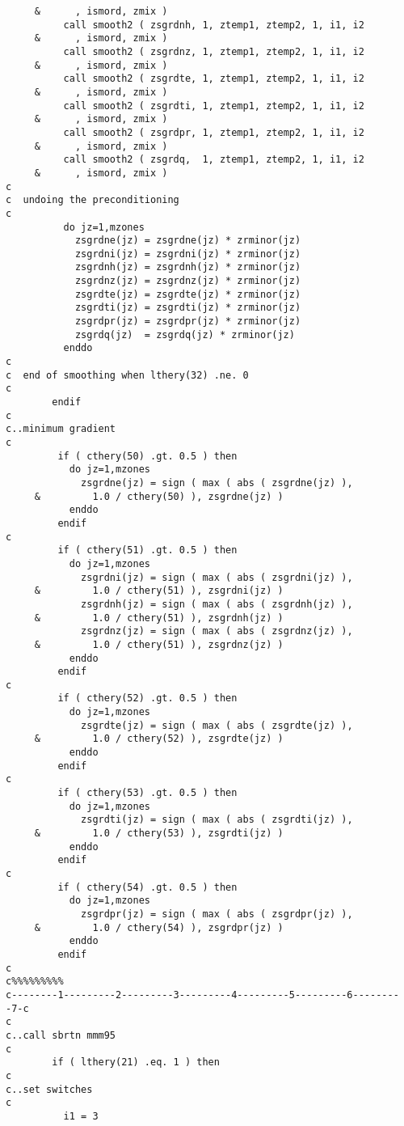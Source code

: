 \begin{verbatim}
     &      , ismord, zmix )
          call smooth2 ( zsgrdnh, 1, ztemp1, ztemp2, 1, i1, i2
     &      , ismord, zmix )
          call smooth2 ( zsgrdnz, 1, ztemp1, ztemp2, 1, i1, i2
     &      , ismord, zmix )
          call smooth2 ( zsgrdte, 1, ztemp1, ztemp2, 1, i1, i2
     &      , ismord, zmix )
          call smooth2 ( zsgrdti, 1, ztemp1, ztemp2, 1, i1, i2
     &      , ismord, zmix )
          call smooth2 ( zsgrdpr, 1, ztemp1, ztemp2, 1, i1, i2
     &      , ismord, zmix )
          call smooth2 ( zsgrdq,  1, ztemp1, ztemp2, 1, i1, i2
     &      , ismord, zmix )
c
c  undoing the preconditioning
c
          do jz=1,mzones
            zsgrdne(jz) = zsgrdne(jz) * zrminor(jz)
            zsgrdni(jz) = zsgrdni(jz) * zrminor(jz)
            zsgrdnh(jz) = zsgrdnh(jz) * zrminor(jz)
            zsgrdnz(jz) = zsgrdnz(jz) * zrminor(jz)
            zsgrdte(jz) = zsgrdte(jz) * zrminor(jz)
            zsgrdti(jz) = zsgrdti(jz) * zrminor(jz)
            zsgrdpr(jz) = zsgrdpr(jz) * zrminor(jz)
            zsgrdq(jz)  = zsgrdq(jz) * zrminor(jz)
          enddo
c
c  end of smoothing when lthery(32) .ne. 0
c
        endif
c
c..minimum gradient
c
         if ( cthery(50) .gt. 0.5 ) then
           do jz=1,mzones
             zsgrdne(jz) = sign ( max ( abs ( zsgrdne(jz) ),
     &         1.0 / cthery(50) ), zsgrdne(jz) )
           enddo
         endif
c
         if ( cthery(51) .gt. 0.5 ) then
           do jz=1,mzones
             zsgrdni(jz) = sign ( max ( abs ( zsgrdni(jz) ),
     &         1.0 / cthery(51) ), zsgrdni(jz) )
             zsgrdnh(jz) = sign ( max ( abs ( zsgrdnh(jz) ),
     &         1.0 / cthery(51) ), zsgrdnh(jz) )
             zsgrdnz(jz) = sign ( max ( abs ( zsgrdnz(jz) ),
     &         1.0 / cthery(51) ), zsgrdnz(jz) )
           enddo
         endif
c
         if ( cthery(52) .gt. 0.5 ) then
           do jz=1,mzones
             zsgrdte(jz) = sign ( max ( abs ( zsgrdte(jz) ),
     &         1.0 / cthery(52) ), zsgrdte(jz) )
           enddo
         endif
c
         if ( cthery(53) .gt. 0.5 ) then
           do jz=1,mzones
             zsgrdti(jz) = sign ( max ( abs ( zsgrdti(jz) ),
     &         1.0 / cthery(53) ), zsgrdti(jz) )
           enddo
         endif
c
         if ( cthery(54) .gt. 0.5 ) then
           do jz=1,mzones
             zsgrdpr(jz) = sign ( max ( abs ( zsgrdpr(jz) ),
     &         1.0 / cthery(54) ), zsgrdpr(jz) )
           enddo
         endif
c
c%%%%%%%%%
c--------1---------2---------3---------4---------5---------6---------7-c
c
c..call sbrtn mmm95
c
        if ( lthery(21) .eq. 1 ) then
c
c..set switches
c
          i1 = 3

\end{verbatim}
